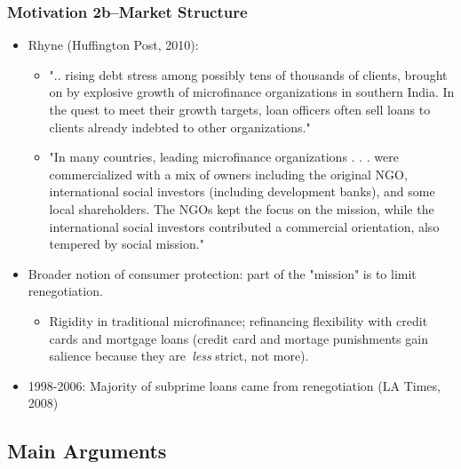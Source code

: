 \documentclass[11pt]{article}%
\providecommand{\DIFaddbegin}{} %
\providecommand{\DIFaddend}{} %
\begin{document}
\DIFaddbegin \frametitle{Motivation 2b--Market Structure}%


\DIFaddend \begin{itemize}
\item Rhyne (Huffington Post, 2010):

\begin{itemize}
\item ".. rising debt stress among possibly tens of thousands of clients,
brought on by explosive growth of microfinance organizations in southern
India. In the quest to meet their growth targets, loan officers often sell
loans to clients already indebted to other organizations."

\item "In many countries, leading microfinance organizations . . . were
commercialized with a mix of owners including the original NGO, international
social investors (including development banks), and some local shareholders.
The NGOs kept the focus on the mission, while the international social
investors contributed a commercial orientation, also tempered by social mission."
\end{itemize}

\item Broader notion of consumer protection: part of the "mission" is to limit renegotiation.

\begin{itemize}
\item Rigidity in traditional microfinance; refinancing flexibility with
credit cards and mortgage loans (credit card and mortage punishments gain
salience because they are\textit{\ less} strict, not more).
\end{itemize}

\item 1998-2006: Majority of subprime loans came from renegotiation (LA Times, 2008)
\end{itemize}

\subsection{Main Arguments}
\end{document}
